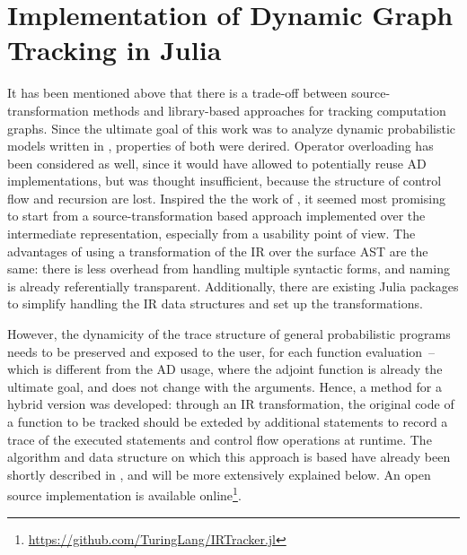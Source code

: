 \chapter{Implementation of Dynamic Graph Tracking in Julia}
\label{cha:impl-dynam-graph}

It has been mentioned above that there is a trade-off between source-transformation methods and
library-based approaches for tracking computation graphs.  Since the ultimate goal of this work was
to analyze dynamic probabilistic models written in \turingjl{}, properties of both were derired.
Operator overloading has been considered as well, since it would have allowed to potentially reuse
AD implementations, but was thought insufficient, because the structure of control flow and
recursion are lost.  Inspired the the work of \textcite{innes2018don}, it seemed most promising to
start from a source-transformation based approach implemented over the intermediate representation,
especially from a usability point of view.  The advantages of using a transformation of the IR over
the surface AST are the same: there is less overhead from handling multiple syntactic forms, and
naming is already referentially transparent.  Additionally, there are existing Julia packages to
simplify handling the IR data structures and set up the transformations.

However, the dynamicity of the trace structure of general probabilistic programs needs to be
preserved and exposed to the user, for each function evaluation~-- which is different from the AD
usage, where the adjoint function is already the ultimate goal, and does not change with the
arguments.  Hence, a method for a hybrid version was developed: through an IR transformation, the
original code of a function to be tracked should be exteded by additional statements to record a
trace of the executed statements and control flow operations at runtime.  The algorithm and data
structure on which this approach is based have already been shortly described in
\textcite{gabler2019graph}, and will be more extensively explained below.  An open source
implementation is available
online\footnote{\protect\url{https://github.com/TuringLang/IRTracker.jl}}.

